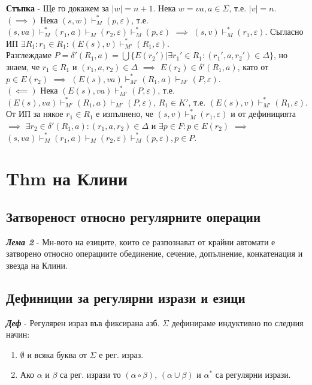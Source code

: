 \documentclass[fleqn,12pt]{article}
\begin{document}
\begin{flushleft}
\textbf{Стъпка} - Ще го докажем за $|w| = n + 1$. Нека $w = va, a \in \Sigma$, т.е. $|v| = n$. \\

$(\implies)$ Нека $(s, w) \vdash_M^* (p, \varepsilon)$, т.е. $(s, va) \vdash_M^* (r_1, a) \vdash_M (r_2, \varepsilon) \vdash_M^* (p, \varepsilon)$ $\implies$ $(s, v) \vdash_M^* (r_1, \varepsilon)$. Съгласно ИП $\exists R_1: r_1 \in R_1: (E(s), v) \vdash_{M'}^* (R_1, \varepsilon)$. \\
Разглеждаме $P = \delta'(R_1, a) = \bigcup \{E(r_2') | \exists r_1' \in R_1: (r_1', a, r_2') \in \Delta\}$, но знаем, че $r_1 \in R_1$ и $(r_1, a, r_2) \in \Delta$ $\implies$ $E(r_2) \in \delta'(R_1, a)$, като от $p \in E(r_2)$ $\implies$ $(E(s), va) \vdash_{M'}^* (R_1, a) \vdash_{M'} (P, \varepsilon)$. \\

$(\impliedby)$ Нека $(E(s), va) \vdash_{M'}^* (P, \varepsilon)$, т.е. $(E(s), va) \vdash_{M'}^* (R_1, a) \vdash_{M'} (P, \varepsilon)$, $R_1 \in K'$, т.е. $(E(s), v) \vdash_{M'}^* (R_1, \varepsilon)$.\\
От ИП за някое $r_1 \in R_1$ е изпълнено, че $(s, v) \vdash_M^* (r_1, \varepsilon)$ и от дефиницията $\implies$ $\exists r_2 \in \delta'(R_1, a): (r_1, a, r_2) \in \Delta$ и $\exists p \in F: p \in E(r_2)$ $\implies$ $(s, va) \vdash_M^* (r_1, a) \vdash_M (r_2, \varepsilon) \vdash_M^* (p, \varepsilon), p \in P$. \square

\section{Thm на Клини}
\subsection{Затвореност относно регулярните операции}

\textit{\textbf{Лема 2}} - Мн-вото на езиците, които се разпознават от крайни автомати е затворено относно операциите обединение, сечение, допълнение, конкатенация и звезда на Клини.

\subsection{Дефиниции за регулярни изрази и езици}

\textit{\textbf{Деф}} - Регулярен израз във фиксирана азб. $\Sigma$ дефинираме индуктивно по следния начин:
\begin{enumerate}
    \item $\emptyset$ и всяка буква от $\Sigma$ е рег. израз.
    \item Ако $\alpha$ и $\beta$ са рег. изрази то $(\alpha \circ \beta)$, $(\alpha \cup \beta)$ и $\alpha^*$ са регулярни изрази.
\end{enumerate}


\end{flushleft}
\end{document}
